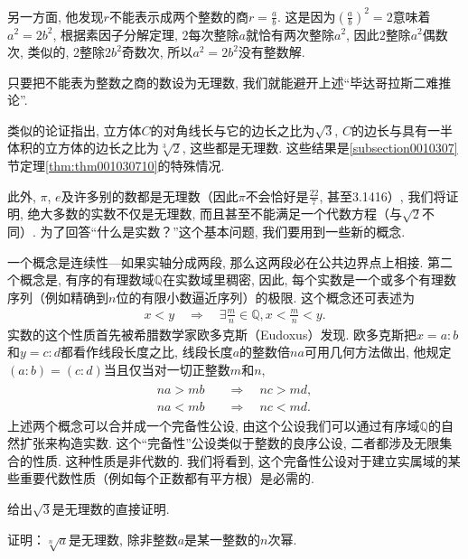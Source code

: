 另一方面, 他发现$r$不能表示成两个整数的商$r = \frac{a}{b}$. 这是因为$(\frac{a}{b})^2 = 2$意味着$a^2=2b^2$, 根据素因子分解定理, $2$每次整除$a$就恰有两次整除$a^2$, 因此$2$整除$a^2$偶数次, 类似的, 2整除$2b^2$奇数次, 所以$a^2=2b^2$没有整数解. 

只要把不能表为整数之商的数设为无理数, 我们就能避开上述“毕达哥拉斯二难推论”. 

类似的论证指出, 立方体$C$的对角线长与它的边长之比为$\sqrt{3}$, $C$的边长与具有一半体积的立方体的边长之比为$\sqrt[3]{2}$, 这些都是无理数. 这些结果是\ref{subsection0010307}节定理\ref{thm:thm001030710}的特殊情况. 

此外, $\pi$, $e$及许多别的数都是无理数（因此$\pi$不会恰好是$\frac{22}{7}$, 甚至3.1416）, 我们将证明, 绝大多数的实数不仅是无理数, 而且甚至不能满足一个代数方程（与$\sqrt{2}$不同）. 为了回答“什么是实数？”这个基本问题, 我们要用到一些新的概念. 

一个概念是连续性---如果实轴分成两段, 那么这两段必在公共边界点上相接. 第二个概念是, 有序的有理数域$\mathbb{Q}$在实数域里稠密, 因此, 每个实数是一个或多个有理数序列（例如精确到$n$位的有限小数逼近序列）的极限. 这个概念还可表述为
\begin{gather}\label{equ001040102}
x < y \quad \Rightarrow\quad \exists \frac{m}{n} \in \mathbb{Q}, x < \frac{m}{n} < y.
\end{gather}
实数的这个性质首先被希腊数学家欧多克斯（Eudoxus）发现. 欧多克斯把$x=a:b$和$y=c:d$都看作线段长度之比, 线段长度$a$的整数倍$na$可用几何方法做出, 他规定$(a:b)=(c:d)$当且仅当对一切正整数$m$和$n$, 
\begin{gather}\label{equ001040103}
\begin{aligned}
na > mb \quad &\Rightarrow \quad nc > md, \\
na < mb \quad &\Rightarrow \quad nc < md.
\end{aligned}
\end{gather}
上述两个概念可以合并成一个完备性公设, 由这个公设我们可以通过有序域$\mathbb{Q}$的自然扩张来构造实数. 这个“完备性”公设类似于整数的良序公设, 二者都涉及无限集合的性质. 这种性质是非代数的. 我们将看到, 这个完备性公设对于建立实属域的某些重要代数性质（例如每个正数都有平方根）是必需的. 

\begin{problem}
给出$\sqrt{3}$是无理数的直接证明. 
\end{problem}

\begin{problem}
证明：$\sqrt[n]{a}$是无理数, 除非整数$a$是某一整数的$n$次幂. 
\end{problem}

